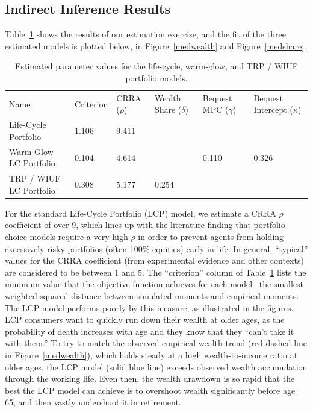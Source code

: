 \documentclass{article}
\newcommand{\CRRA}{\rho}
\begin{document}
\subsection{Indirect Inference Results}

Table~\ref{parameters} shows the results of our estimation exercise, and the fit of the three estimated models is plotted below, in Figure~\ref{medwealth} and Figure~\ref{medshare}.

\begin{table}
\centering
\caption[]{Estimated parameter values for the life-cycle, warm-glow, and TRP / WIUF portfolio models.}
\label{parameters}
\begin{tabular}{p{}p{}p{}p{}p{}p{}}
\toprule
Name & Criterion & CRRA ($\CRRA$) & Wealth Share ($\delta$) & Bequest MPC ($\gamma$) & Bequest Intercept ($\kappa$) \\
Life-Cycle Portfolio & 1.106 & 9.411 &  &  &  \\
Warm-Glow LC Portfolio & 0.104 & 4.614 &  & 0.110 & 0.326 \\
TRP / WIUF LC Portfolio & 0.308 & 5.177 & 0.254 &  &  \\
\bottomrule
\end{tabular}
\end{table}

For the standard Life-Cycle Portfolio (LCP) model, we estimate a CRRA $\CRRA$ coefficient of over 9, which lines up with the literature finding that portfolio choice models require a very high $\CRRA$ in order to prevent agents from holding excessively risky portfolios (often 100\% equities) early in life.
In general, ``typical'' values for the CRRA coefficient (from experimental evidence and other contexts) are considered to be between 1 and 5.
The ``criterion'' column of Table~\ref{parameters} lists the minimum value that the objective function achieves for each model-- the smallest weighted squared distance between simulated moments and empirical moments.
The LCP model performs poorly by this measure, as illustrated in the figures.
LCP consumers want to quickly run down their wealth at older ages, as the probability of death increases with age and they know that they ``can't take it with them.''
To try to match the observed empirical wealth trend (red dashed line in Figure~\ref{medwealth}), which holds steady at a high wealth-to-income ratio at older ages, the LCP model (solid blue line) exceeds observed wealth accumulation through the working life.
Even then, the wealth drawdown is so rapid that the best the LCP model can achieve is to overshoot wealth significantly before age 65, and then vastly undershoot it in retirement.
\end{document}
